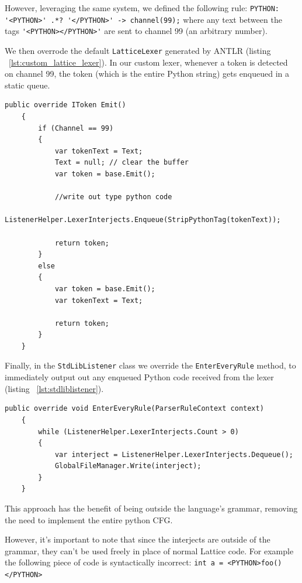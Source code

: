However, leveraging the same system, we defined the following rule: \lstinline{PYTHON: '<PYTHON>' .*? '</PYTHON>' -> channel(99);}
where any text between the tags \lstinline{'<PYTHON></PYTHON>'} are sent to channel 99 (an arbitrary number).

We then overrode the default \lstinline{LatticeLexer} generated by ANTLR (listing ~\ref{lst:custom_lattice_lexer}).
In our custom lexer, whenever a token is detected on channel 99, the token (which is the entire Python string)
gets enqueued in a static queue.

\begin{lstlisting}[caption={Excerpt from the class CustomLatticeLexer},captionpos=b, label={lst:custom_lattice_lexer}]
    public override IToken Emit()
    {
        if (Channel == 99)
        {
            var tokenText = Text;
            Text = null; // clear the buffer
            var token = base.Emit();

            //write out type python code
            ListenerHelper.LexerInterjects.Enqueue(StripPythonTag(tokenText));

            return token;
        }
        else
        {
            var token = base.Emit();
            var tokenText = Text;

            return token;
        }
    }
\end{lstlisting}
Finally, in the \lstinline{StdLibListener} class we override the \lstinline{EnterEveryRule} method, to immediately
output out any enqueued Python code received from the lexer (listing ~\ref{lst:stdliblistener}).

\begin{lstlisting}[caption={Excerpt from the class StdLibListener},captionpos=b, label={lst:stdliblistener}]
    public override void EnterEveryRule(ParserRuleContext context)
    {
        while (ListenerHelper.LexerInterjects.Count > 0)
        {
            var interject = ListenerHelper.LexerInterjects.Dequeue();
            GlobalFileManager.Write(interject);
        }
    }
\end{lstlisting}

This approach has the benefit of being outside the language's grammar, removing the need to implement the entire python
CFG.

However, it's important to note that since the interjects are outside of the grammar, they can't be used freely in place
of normal Lattice code.
For example the following piece of code is syntactically incorrect: \lstinline{int a = <PYTHON>foo()</PYTHON>}

